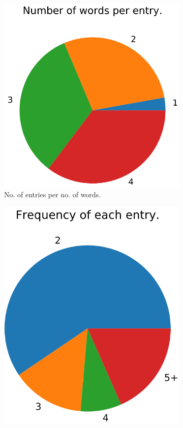 \begin{figure}
  \begin{subfigure}[t]{0.52\textwidth}
    \centering
    \includegraphics[width=\textwidth]{figures/vocab/after/words_per_entry.PNG}
    \caption{No. of entries per no. of words.}
    \label{fig:vocab_after_words}
  \end{subfigure}
  \hfill
  \begin{subfigure}[t]{0.44\textwidth}
    \centering
    \includegraphics[width=\textwidth]{figures/vocab/after/entry_frequency.PNG}

\end{subfigure}
\end{figure}
